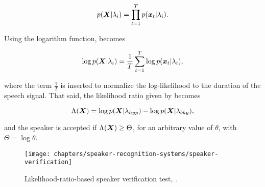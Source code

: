 \begin{equation}
    p(\dvec{X}|\lambda_i) = \prod_{t=1}^T p(\dvec{x}_t|\lambda_i).
    \label{eq:likelihood-prod}
\end{equation}

\noindent Using the logarithm function,  becomes

\begin{equation}
    \log p(\dvec{X}|\lambda_i) = \frac{1}{T} \sum_{t=1}^T \log p(\dvec{x}_t|\lambda_i),
    \label{eq:log-likelihood-sum}
\end{equation}

\noindent where the term $\frac{1}{T}$ is inserted to normalize the log-likelihood to the duration of the speech signal. That said, the likelihood ratio given by  becomes

\begin{equation}
    \Lambda(\dvec{X}) = \log p(\dvec{X}|\lambda_{hyp}) - \log p(\dvec{X}|\lambda_{bkg}),
    \label{eq:score_of_X}
\end{equation}

\noindent and the speaker is accepted if $\Lambda(\boldsymbol{X}) \geq \Theta$, for an arbitrary value of $\theta$, with $\Theta = \log\theta$.

\begin{figure}[ht]
    \centering
    \texttt{[image: chapters/speaker-recognition-systems/speaker-verification]}
    \caption{Likelihood-ratio-based speaker verification test, .}
    \label{fig:speaker-verification}
\end{figure}